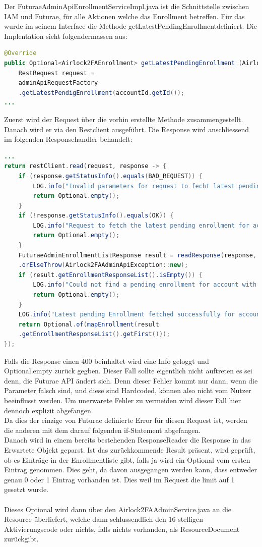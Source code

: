 Der FuturaeAdminApiEnrollmentServiceImpl.java ist die Schnittstelle zwischen IAM und Futurae, für alle Aktionen welche das Enrollment betreffen. Für das wurde im seinem Interface die Methode \flqq getLatestPendingEnrollment\frqq definiert. Die Implentation sieht folgendermassen aus:
\begin{lstlisting}[language=Java]
@Override
public Optional<Airlock2FAEnrollment> getLatestPendingEnrollment (Airlock2FAAccountId accountId) {
	RestRequest request = 
	adminApiRequestFactory
	.getLatestPendigEnrollment(accountId.getId());
...
\end{lstlisting}
Zuerst wird der Request über die vorhin erstellte Methode zusammengestellt.
Danach wird er via den Restclient ausgeführt. Die Response wird anschliessend im folgenden Responsehandler behandelt:
\begin{lstlisting}[language=Java]
...
return restClient.read(request, response -> {
	if (response.getStatusInfo().equals(BAD_REQUEST)) {
		LOG.info("Invalid parameters for request to fecht latest pending enrollment for account with id: " + accountId.getId());
		return Optional.empty();
	}
	if (!response.getStatusInfo().equals(OK)) {
		LOG.info("Request to fetch the latest pending enrollment for account with id '" + accountId.getId() + "' failed with code: " + response.getStatusInfo());
		return Optional.empty();
	}
	FuturaeAdminEnrollmentListResponse result = readResponse(response, FuturaeAdminEnrollmentListResponse.class, request)
	.orElseThrow(Airlock2FAAdminApiException::new);
	if (result.getEnrollmentResponseList().isEmpty()) {
		LOG.info("Could not find a pending enrollment for account with id: " + accountId.getId());
		return Optional.empty();
	}
	LOG.info("Latest pending Enrollment fetched successfully for account with id: " + accountId.getId());
	return Optional.of(mapEnrollment(result
	.getEnrollmentResponseList().getFirst()));
});
\end{lstlisting}
Falls die Response einen 400 beinhaltet wird eine Info geloggt und Optional.empty zurück gegben. Dieser Fall sollte eigentlich nicht auftreten es sei denn, die Futurae API ändert sich. Denn dieser Fehler kommt nur dann, wenn die Parameter falsch sind, und diese sind Hardcoded, können also nicht vom Nutzer beeinflusst werden. Um unerwarete Fehler zu vermeiden wird dieser Fall hier dennoch explizit abgefangen.\\
Da dies der einzige von Futurae definierte Error für diesen Request ist, werden die anderen mit dem darauf folgenden if-Statement abgefangen.\\
Danach wird in einem bereits bestehenden ResponseReader die Response in das Erwartete Objekt geparst. Ist das zurückkommende Result präsent, wird geprüft, ob es Einträge in der Enrollmentliste gibt, falls ja wird ein Optional vom ersten Eintrag genommen. Dies geht, da davon ausgegangen werden kann, dass entweder genau 0 oder 1 Eintrag vorhanden ist. Dies weil im Request die limit auf 1 gesetzt wurde.\\
\\
Dieses Optional wird dann über den Airlock2FAAdminService.java an die Resource überliefert, welche dann schlussendlich den 16-stelligen Aktivierungscode oder nichts, falls nichts vorhanden, als ResourceDocument zurückgibt.
